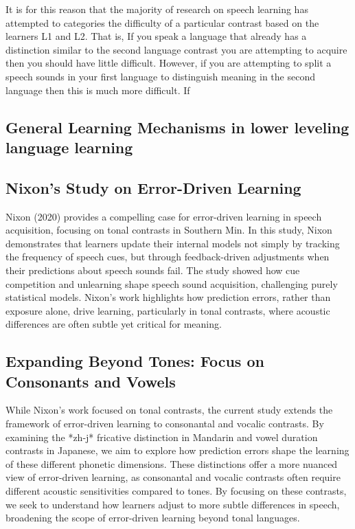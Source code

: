 It is for this reason that the majority of research on speech learning has attempted to categories the difficulty of a particular contrast based on the learners L1 and L2. That is, If you speak a language that already has a distinction similar to the second language contrast you are attempting to acquire then you should have little difficult. However, if you are attempting to split a speech sounds in your first language to distinguish meaning in the second language then this is much more difficult. If 

\subsection{General Learning Mechanisms in lower leveling language learning}




\subsection{Nixon’s Study on Error-Driven Learning}

Nixon (2020) provides a compelling case for error-driven learning in speech acquisition, focusing on tonal contrasts in Southern Min. In this study, Nixon demonstrates that learners update their internal models not simply by tracking the frequency of speech cues, but through feedback-driven adjustments when their predictions about speech sounds fail. The study showed how cue competition and unlearning shape speech sound acquisition, challenging purely statistical models. Nixon's work highlights how prediction errors, rather than exposure alone, drive learning, particularly in tonal contrasts, where acoustic differences are often subtle yet critical for meaning.

\subsection{Expanding Beyond Tones: Focus on Consonants and Vowels}

While Nixon's work focused on tonal contrasts, the current study extends the framework of error-driven learning to consonantal and vocalic contrasts. By examining the *zh-j* fricative distinction in Mandarin and vowel duration contrasts in Japanese, we aim to explore how prediction errors shape the learning of these different phonetic dimensions. These distinctions offer a more nuanced view of error-driven learning, as consonantal and vocalic contrasts often require different acoustic sensitivities compared to tones. By focusing on these contrasts, we seek to understand how learners adjust to more subtle differences in speech, broadening the scope of error-driven learning beyond tonal languages.

